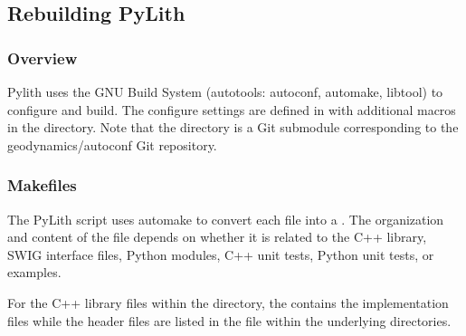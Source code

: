 

\subsection{Rebuilding PyLith}

\subsubsection{Overview}

Pylith uses the GNU Build System (autotools: autoconf, automake,
libtool) to configure and build. The configure settings are defined in
 with additional macros in the 
directory. Note that the  directory is a Git submodule
corresponding to the geodynamics/autoconf Git repository.

\subsubsection{Makefiles}

The PyLith  script uses automake to convert each
 file into a . The
organization and content of the  file depends on
whether it is related to the C++ library, SWIG interface files, Python
modules, C++ unit tests, Python unit tests, or examples.

For the C++ library files within the  directory, the
 contains the implementation files while
the header files are listed in the  file within
the underlying directories.

